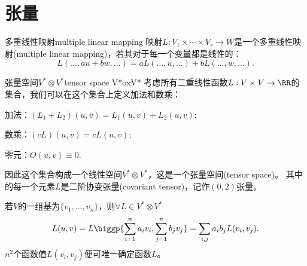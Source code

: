 \section{张量}
\begin{definition}{多重线性映射}{multiple linear mapping}
	映射$L:V_1\times\cdots\times V_r\to W$是一个多重线性映射(multiple linear mapping)，若其对于每一个变量都是线性的：
	\[
		L(\ldots,au+bw,\ldots)=aL(\ldots,u,\ldots)+bL(\ldots,w,\ldots).
	\]
\end{definition}
\begin{definition}{张量空间$V^\ast\otimes V^\ast$}{tensor space V*oxV*}
	考虑所有二重线性函数$L:V\times V\to\RR$的集合，我们可以在这个集合上定义加法和数乘：
	\begin{compactitem}
		\item 加法：$(L_1+L_2)(u,v)=L_1(u,v)+L_2(u,v);$
		\item 数乘：$(cL)(u,v)=cL(u,v);$
		\item 零元：$O(u,v)\equiv 0.$
	\end{compactitem}
	因此这个集合构成一个线性空间$V^\ast\otimes V^\ast$，这是一个张量空间(tensor space)。
	其中的每一个元素$L$是二阶协变张量(covariant tensor)，记作$(0,2)$张量。
\end{definition}
若$V$的一组基为$\{v_1,\ldots,v_n\}$，则$\forall L\in V^\ast\otimes V^\ast$ 
\[
	L(u,v)=L\biggp{\sum_{i=1}^na_iv_i,\sum_{j=1}^nb_jv_j}=\sum_{i,j}a_ib_jL(v_i,v_j).
\]
$n^2$个函数值$L(v_i,v_j)$便可唯一确定函数$L$。


